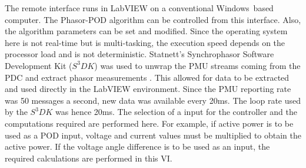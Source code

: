 \documentclass[journal]{IEEEtran}
\begin{document}
The remote interface runs in LabVIEW on a conventional Windows\textregistered~based computer. The Phasor-POD algorithm can be controlled from this interface. Also, the algorithm parameters can be set and modified. Since the operating system here is not real-time but is multi-tasking, the execution speed depends on the processor load and is not deterministic. Statnett's Synchrophasor Software Development Kit ($S^{3}DK$) was used to unwrap the PMU streams coming from the PDC and extract phasor measurements \cite{SDK}. This allowed for data to be extracted and used directly in the LabVIEW environment. Since the PMU reporting rate was 50 messages a second, new data was available every 20ms. The loop rate used by the $S^{3}DK$ was hence 20ms. The selection of a input for the controller and the computations required are performed here. For example, if active power is to be used as a POD input, voltage and current values must be multiplied to obtain the active power. If the voltage angle difference is to be used as an input, the required calculations are performed in this VI.\\





%
%
\end{document}

